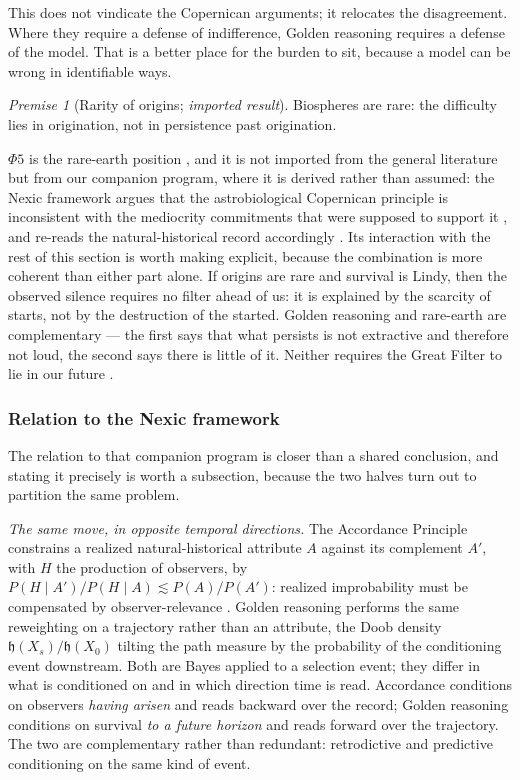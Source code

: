 \documentclass[11pt]{article}
\numberwithin{equation}{section}
\theoremstyle{plain}
\theoremstyle{definition}
\theoremstyle{remark}
\newcommand{\hm}{\mathfrak{h}}
\newtheorem{premise}{Premise}
\begin{document}
This does not vindicate the Copernican arguments; it relocates the
disagreement. Where they require a defense of indifference, Golden
reasoning requires a defense of the model. That is a better place for
the burden to sit, because a model can be wrong in identifiable ways.

\setcounter{premise}{4} %
\begin{premise}[Rarity of origins; \emph{imported result}]
\label{gr:phi5}
Biospheres are rare: the difficulty lies in origination, not in
persistence past origination.
\end{premise}

$\Phi5$ is the rare-earth position \cite{WB00}, and it is not imported
from the general literature but from our companion program,
where it is derived rather than assumed: the Nexic framework
\cite{Nexus} argues that the astrobiological Copernican principle
is inconsistent with the mediocrity commitments that were supposed to
support it \cite{Ben26Found}, and re-reads the natural-historical record
accordingly \cite{Ben26Optimal}. Its interaction with the rest of this
section is worth making explicit, because the combination is more
coherent than either part alone. If origins are rare and survival is
Lindy, then the observed silence requires no filter ahead of us: it is
explained by the scarcity of starts, not by the destruction of the
started. Golden reasoning and rare-earth are complementary --- the first
says that what persists is not extractive and therefore not loud, the
second says there is little of it. Neither requires the Great Filter to
lie in our future \cite{Han98,SDO18}.

\subsubsection{Relation to the Nexic framework}
\label{gr:subsub:nexic}

The relation to that companion program is closer than a shared
conclusion, and stating it precisely is worth a subsection, because the
two halves turn out to partition the same problem.

\emph{The same move, in opposite temporal directions.} The Accordance
Principle constrains a realized natural-historical attribute $A$ against
its complement $A'$, with $H$ the production of observers, by
$P(H\mid A')/P(H\mid A)\lesssim P(A)/P(A')$: realized improbability must
be compensated by observer-relevance \cite{Ben26Found}. Golden reasoning
performs the same reweighting on a trajectory rather than an attribute,
the Doob density $\hm(X_s)/\hm(X_0)$ tilting the path measure by the
probability of the conditioning event downstream. Both are Bayes applied
to a selection event; they differ in what is conditioned on and in which
direction time is read. Accordance conditions on observers \emph{having
arisen} and reads backward over the record; Golden reasoning conditions
on survival \emph{to a future horizon} and reads forward over the
trajectory. The two are complementary rather than redundant:
retrodictive and predictive conditioning on the same kind of event.
\end{document}
